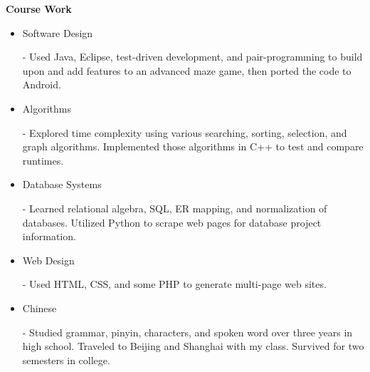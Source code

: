 \documentclass[11pt]{article}
\begin{document}
\begin{LARGE}
	\bf Course Work
\end{LARGE}

\vspace{-0.5em}

\begin{itemize}
	\item \begin{large}\begin{bf}Software Design\end{bf}\end{large} - Used Java, Eclipse, test-driven development, and pair-programming to build upon and add features to an advanced maze game, then ported the code to Android.
	\vspace{-0.5em}
	\item \begin{large}\begin{bf}Algorithms\end{bf}\end{large} - Explored time complexity using various searching, sorting, selection, and graph algorithms. Implemented those algorithms in C++ to test and compare runtimes.
	\vspace{-0.5em}
	\item \begin{large}\begin{bf}Database Systems\end{bf}\end{large} - Learned relational algebra, SQL, ER mapping, and normalization of databases. Utilized Python to scrape web pages for database project information.
	\vspace{-0.5em}
	\item \begin{large}\begin{bf}Web Design\end{bf}\end{large} - Used HTML, CSS, and some PHP to generate multi-page web sites.
	\vspace{-0.5em}
	\item \begin{large}\begin{bf}Chinese\end{bf}\end{large} - Studied grammar, pinyin, characters, and spoken word over three years in high school. Traveled to Beijing and Shanghai with my class. Survived for two semesters in college.
\end{itemize}
\end{document}
